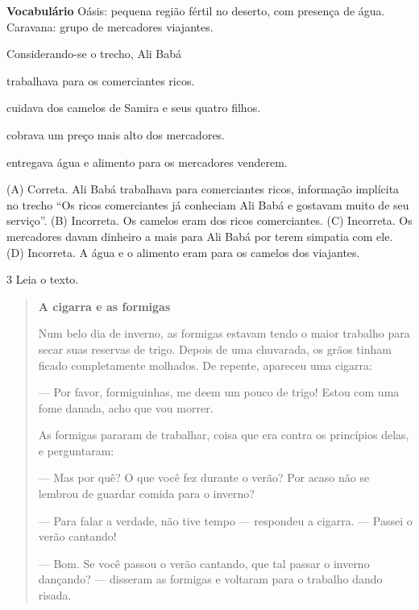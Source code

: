 \textbf{Vocabulário}
Oásis: pequena região fértil no deserto, com presença de água.
Caravana: grupo de mercadores viajantes.

Considerando-se o trecho, Ali Babá

\begin{escolha}
\item trabalhava para os comerciantes ricos.

\item cuidava dos camelos de Samira e seus quatro filhos.

\item cobrava um preço mais alto dos mercadores.

\item entregava água e alimento para os mercadores venderem.
\end{escolha}


(A) Correta. Ali Babá trabalhava para comerciantes ricos, informação
implícita no trecho ``Os ricos comerciantes já conheciam Ali Babá e
gostavam muito de seu serviço''.
(B) Incorreta. Os camelos eram dos ricos comerciantes.
(C) Incorreta. Os mercadores davam dinheiro a mais para Ali Babá por
terem simpatia com ele.
(D) Incorreta. A água e o alimento eram para os camelos dos viajantes.

\num{3} Leia o texto.

\begin{quote}
\textbf{A cigarra e as formigas}

Num belo dia de inverno, as formigas estavam tendo o maior
trabalho para secar suas reservas de trigo. Depois de uma
chuvarada, os grãos tinham ficado completamente molhados. De
repente, apareceu uma cigarra:

--- Por favor, formiguinhas, me deem um pouco de
trigo! Estou com uma fome danada, acho que vou morrer.

As formigas pararam de trabalhar, coisa que era contra
os princípios delas, e perguntaram:

--- Mas por quê? O que você fez durante o verão? Por
acaso não se lembrou de guardar comida para o inverno?

--- Para falar a verdade, não tive tempo --- respondeu
a cigarra. --- Passei o verão cantando!

--- Bom. Se você passou o verão cantando, que tal
passar o inverno dançando? --- disseram as formigas e
voltaram para o trabalho dando risada.

\end{quote}

